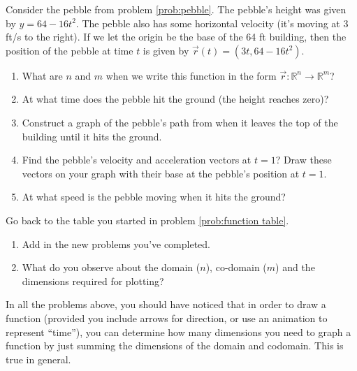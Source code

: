 \begin{problem}%
%
Consider the pebble from problem \ref{prob:pebble}. The pebble's height was given by $y=64-16t^2$.  The pebble also has some horizontal velocity (it's moving at 3 ft/s to the right).  If we let the origin be the base of the 64 ft building, then the position of the pebble at time $t$ is given by $\vec r(t) = (3t, 64-16t^2)$.
 \begin{enumerate}
  \item What are $n$ and $m$ when we write this function in the form  $\vec r\colon {\mathbb{R}}^n\to {\mathbb{R}}^m$?
  \item At what time does the pebble hit the ground (the height reaches zero)?
	\item Construct a graph of the pebble's path from when it leaves the top of the building until it hits the ground.
  \item{}%
 Find the pebble's velocity and acceleration vectors at $t=1$? Draw these vectors on your graph with their base at the pebble's position at $t=1$. 
  \item At what speed is the pebble moving when it hits the ground?
 \end{enumerate}
\end{problem}

\begin{problem}
Go back to the table you started in problem \ref{prob:function table}.
\begin{enumerate}
	\item Add in the new problems you've completed.
	\item What do you observe about the domain ($n$), co-domain ($m$) and the dimensions required for plotting?
\end{enumerate}
\end{problem}

In all the problems above, you should have noticed that in order to draw a function (provided you include arrows for direction, or use an animation to represent ``time''), you can determine how many dimensions you need to graph a function by just summing the dimensions of the domain and codomain. This is true in general.

